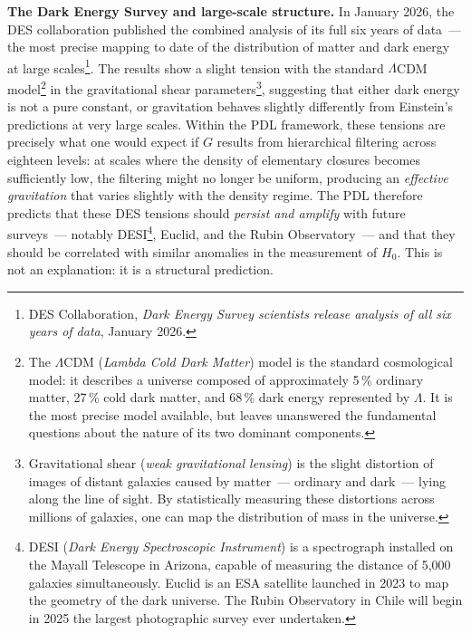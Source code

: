 \documentclass[12pt, a4paper, openright]{book}
\begin{document}
\medskip

\textbf{The Dark Energy Survey and large-scale structure.} In January 2026, the DES collaboration published the combined analysis of its full six years of data~--- the most precise mapping to date of the distribution of matter and dark energy at large scales\footnote{DES Collaboration, \textit{Dark Energy Survey scientists release analysis of all six years of data}, January 2026.}. The results show a slight tension with the standard $\Lambda$CDM model\footnote{The $\Lambda$CDM (\textit{Lambda Cold Dark Matter}) model is the standard cosmological model: it describes a universe composed of approximately 5\,\% ordinary matter, 27\,\% cold dark matter, and 68\,\% dark energy represented by $\Lambda$. It is the most precise model available, but leaves unanswered the fundamental questions about the nature of its two dominant components.} in the gravitational shear parameters\footnote{Gravitational shear (\textit{weak gravitational lensing}) is the slight distortion of images of distant galaxies caused by matter~--- ordinary and dark~--- lying along the line of sight. By statistically measuring these distortions across millions of galaxies, one can map the distribution of mass in the universe.}, suggesting that either dark energy is not a pure constant, or gravitation behaves slightly differently from Einstein's predictions at very large scales. Within the PDL framework, these tensions are precisely what one would expect if $G$ results from hierarchical filtering across eighteen levels: at scales where the density of elementary closures becomes sufficiently low, the filtering might no longer be uniform, producing an \emph{effective gravitation} that varies slightly with the density regime. The PDL therefore predicts that these DES tensions should \emph{persist and amplify} with future surveys~--- notably DESI\footnote{DESI (\textit{Dark Energy Spectroscopic Instrument}) is a spectrograph installed on the Mayall Telescope in Arizona, capable of measuring the distance of 5,000 galaxies simultaneously. Euclid is an ESA satellite launched in 2023 to map the geometry of the dark universe. The Rubin Observatory in Chile will begin in 2025 the largest photographic survey ever undertaken.}, Euclid, and the Rubin Observatory~--- and that they should be correlated with similar anomalies in the measurement of $H_0$. This is not an explanation: it is a structural prediction.

\medskip
\end{document}
